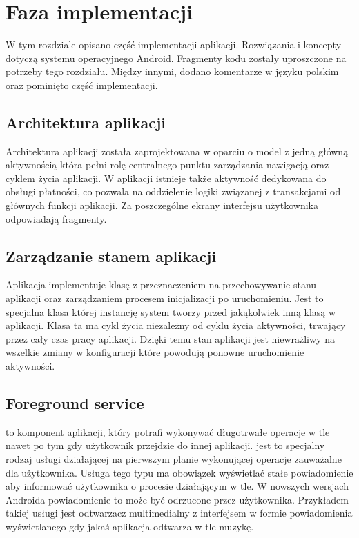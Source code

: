 \section{Faza implementacji}
W tym rozdziale opisano część implementacji aplikacji. Rozwiązania i koncepty dotyczą systemu operacyjnego Android. Fragmenty kodu zostały uproszczone na potrzeby tego rozdziału. Między innymi, dodano komentarze w języku polskim oraz pominięto część implementacji.

\subsection{Architektura aplikacji}
Architektura aplikacji została zaprojektowana w oparciu o model z jedną główną aktywnością która pełni rolę centralnego punktu zarządzania nawigacją oraz cyklem życia aplikacji. W aplikacji istnieje także aktywność dedykowana do obsługi płatności, co pozwala na oddzielenie logiki związanej z transakcjami od głównych funkcji aplikacji. Za poszczególne ekrany interfejsu użytkownika odpowiadają fragmenty.

\subsection{Zarządzanie stanem aplikacji}
Aplikacja implementuje klasę  z przeznaczeniem na przechowywanie stanu aplikacji oraz zarządzaniem procesem inicjalizacji po uruchomieniu. Jest to specjalna klasa której instancję system tworzy przed jakąkolwiek inną klasą w aplikacji. Klasa ta ma cykl życia niezależny od cyklu życia aktywności, trwający przez cały czas pracy aplikacji. Dzięki temu stan aplikacji jest niewrażliwy na wszelkie zmiany w konfiguracji które powodują ponowne uruchomienie aktywności.

\subsection{Foreground service}
 to komponent aplikacji, który potrafi wykonywać długotrwałe operacje w tle nawet po tym gdy użytkownik przejdzie do innej aplikacji.  jest to specjalny rodzaj usługi działającej na pierwszym planie wykonującej operacje zauważalne dla użytkownika. Usługa tego typu ma obowiązek wyświetlać stałe powiadomienie aby informować użytkownika o procesie działającym w tle. W nowszych wersjach Androida powiadomienie to może być odrzucone przez użytkownika. Przykładem takiej usługi jest odtwarzacz multimedialny z interfejsem w formie powiadomienia wyświetlanego gdy jakaś aplikacja odtwarza w tle muzykę.\\

